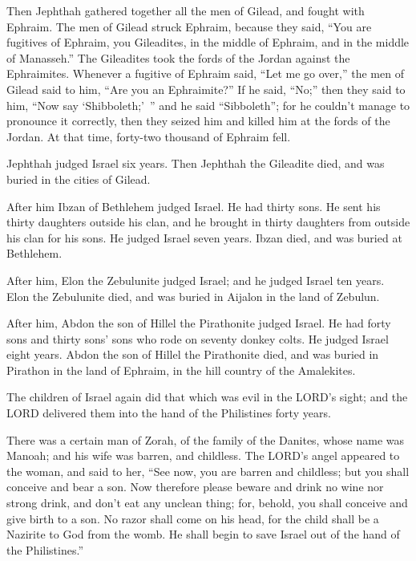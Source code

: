\myverse{}Then Jephthah gathered together all the men of Gilead, and fought
with Ephraim. The men of Gilead struck Ephraim, because they said, “You are fugitives of Ephraim, you
Gileadites, in the middle of Ephraim, and in the middle of Manasseh.”
\myverse{}The Gileadites took the fords of the Jordan against the Ephraimites. Whenever
a fugitive of Ephraim said, “Let me go over,” the men of Gilead said to him, “Are you an Ephraimite?”
If he said, “No;”
\myverse{}then they said to him, “Now say ‘Shibboleth;’ ” and he said “Sibboleth”; for
he couldn’t manage to pronounce it correctly, then they seized him and killed him at the fords of the
Jordan. At that time, forty-two thousand of Ephraim fell.

\myverse{}Jephthah judged Israel six years. Then Jephthah the Gileadite
died, and was buried in the cities of Gilead.

\myverse{}After him Ibzan of Bethlehem judged Israel.
\myverse{}He had thirty sons. He sent his thirty daughters outside his clan, and he brought
in thirty daughters from outside his clan for his sons. He judged Israel seven years.
\myverse{}Ibzan died, and was buried at Bethlehem.

\myverse{}After him, Elon the Zebulunite judged Israel; and he judged
Israel ten years.
\myverse{}Elon the Zebulunite died, and was buried in Aijalon in the land of Zebulun.

\myverse{}After him, Abdon the son of Hillel the Pirathonite judged Israel.
\myverse{}He had forty sons and thirty sons’ sons who rode on seventy donkey colts.
He judged Israel eight years.
\myverse{}Abdon the son of Hillel the Pirathonite died, and was buried in Pirathon
in the land of Ephraim, in the hill country of the Amalekites.


\mychapter{} \myverse*{}The children of Israel again did that which was evil in the LORD’s
sight; and the LORD delivered them into the hand of the Philistines forty years.

\myverse{}There was a certain man of Zorah, of the family of the Danites,
whose name was Manoah; and his wife was barren, and childless.
\myverse{}The LORD’s angel appeared to the woman, and said to her, “See now, you are
barren and childless; but you shall conceive and bear a son.
\myverse{}Now therefore please beware and drink no wine nor strong drink, and don’t eat
any unclean thing;
\myverse{}for, behold, you shall conceive and give birth to a son. No razor shall come
on his head, for the child shall be a Nazirite to God from the womb. He shall begin to save Israel out
of the hand of the Philistines.”

